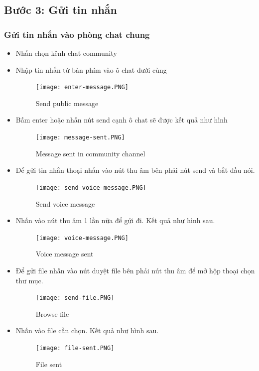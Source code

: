 \documentclass[a4paper]{article}
\begin{document}
	\subsection{Bước 3: Gửi tin nhắn}
	\subsubsection{Gửi tin nhắn vào phòng chat chung}
	\begin{itemize}
		\item Nhấn chọn kênh chat community
		\item Nhập tin nhắn từ bàn phím vào ô chat dưới cùng
		\begin{figure}[H]
			\centering
			\texttt{[image: enter-message.PNG]}
			\caption{Send public message}
			\label{fig:my_label}
		\end{figure}
		\item Bấm enter hoặc nhấn nút send cạnh ô chat sẽ được kết quả như hình
		\begin{figure}[H]
			\centering
			\texttt{[image: message-sent.PNG]}
			\caption{Message sent in community channel}
			\label{fig:my_label}
		\end{figure}
		\item Để gửi tin nhắn thoại nhấn vào nút thu âm bên phải nút send và bắt đầu nói.
		\begin{figure}[H]
			\centering
			\texttt{[image: send-voice-message.PNG]}
			\caption{Send voice message}
			\label{fig:my_label}
		\end{figure}
		\item Nhấn vào nút thu âm 1 lần nữa để gửi đi. Kết quả như hình sau.
		\begin{figure}[H]
			\centering
			\texttt{[image: voice-message.PNG]}
			\caption{Voice message sent}
			\label{fig:my_label}
		\end{figure}
		\item Để gửi file nhấn vào nút duyệt file bên phải nút thu âm để mở hộp thoại chọn thư mục.
		\begin{figure}[H]
			\centering
			\texttt{[image: send-file.PNG]}
			\caption{Browse file}
			\label{fig:my_label}
		\end{figure}
		\item Nhấn vào file cần chọn. Kết quả như hình sau.
		\begin{figure}[H]
			\centering
			\texttt{[image: file-sent.PNG]}
			\caption{File sent}
			\label{fig:my_label}
		\end{figure}
	\end{itemize}
\end{document}
